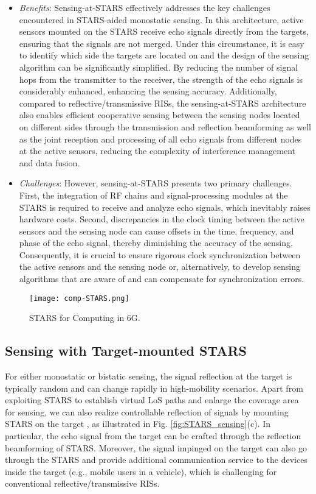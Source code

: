 \documentclass[journal]{IEEEtran}
\theoremstyle{definition}
\begin{document}
\begin{itemize}
    \item \emph{Benefits}: Sensing-at-STARS effectively addresses the key challenges encountered in STARS-aided monostatic sensing. In this architecture, active sensors mounted on the STARS receive echo signals directly from the targets, ensuring that the signals are not merged. Under this circumstance, it is easy to identify which side the targets are located on and the design of the sensing algorithm can be significantly simplified. By reducing the number of signal hops from the transmitter to the receiver, the strength of the echo signals is considerably enhanced, enhancing the sensing accuracy. Additionally, compared to reflective/transmissive RISs, the sensing-at-STARS architecture also enables efficient cooperative sensing between the sensing nodes located on different sides through the transmission and reflection beamforming as well as the joint reception and processing of all echo signals from different nodes at the active sensors, reducing the complexity of interference management and data fusion.

    \item \emph{Challenges}: However, sensing-at-STARS presents two primary challenges. First, the integration of RF chains and signal-processing modules at the STARS is required to receive and analyze echo signals, which inevitably raises hardware costs. Second, discrepancies in the clock timing between the active sensors and the sensing node can cause offsets in the time, frequency, and phase of the echo signal, thereby diminishing the accuracy of the sensing. Consequently, it is crucial to ensure rigorous clock synchronization between the active sensors and the sensing node or, alternatively, to develop sensing algorithms that are aware of and can compensate for synchronization errors.
\end{itemize}

\begin{figure*}[t!]
\begin{center}
    \texttt{[image: comp-STARS.png]}
    \caption{STARS for Computing in 6G.}
    \label{STAR_4}
\end{center}
\end{figure*}

\subsection{Sensing with Target-mounted STARS }
For either monostatic or bistatic sensing, the signal reflection at the target is typically random and can change rapidly in high-mobility scenarios. Apart from exploiting STARS to establish virtual LoS paths and enlarge the coverage area for sensing, we can also realize controllable reflection of signals by mounting STARS on the target \cite{meng2023sensing}, as illustrated in Fig. \ref{fig:STARS_sensing}(c). In particular, the echo signal from the target can be crafted through the reflection beamforming of STARS. Moreover, the signal impinged on the target can also go through the STARS and provide additional communication service to the devices inside the target (e.g., mobile users in a vehicle), which is challenging for conventional reflective/transmissive RISs.
\end{document}
